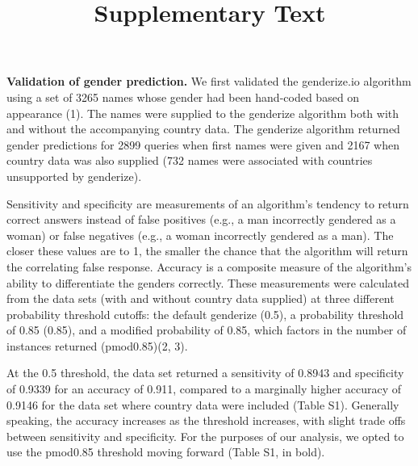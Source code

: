 \documentclass[11pt,]{article}
\title{Supplementary Text}
\author{}
\date{}
\begin{document}
\maketitle

\textbf{Validation of gender prediction.} We first validated the
genderize.io algorithm using a set of 3265 names whose gender had been
hand-coded based on appearance (1). The names were supplied to the
genderize algorithm both with and without the accompanying country data.
The genderize algorithm returned gender predictions for 2899 queries
when first names were given and 2167 when country data was also supplied
(732 names were associated with countries unsupported by genderize).

Sensitivity and specificity are measurements of an algorithm's tendency
to return correct answers instead of false positives (e.g., a man
incorrectly gendered as a woman) or false negatives (e.g., a woman
incorrectly gendered as a man). The closer these values are to 1, the
smaller the chance that the algorithm will return the correlating false
response. Accuracy is a composite measure of the algorithm's ability to
differentiate the genders correctly. These measurements were calculated
from the data sets (with and without country data supplied) at three
different probability threshold cutoffs: the default genderize (0.5), a
probability threshold of 0.85 (0.85), and a modified probability of
0.85, which factors in the number of instances returned (pmod0.85)(2,
3).

At the 0.5 threshold, the data set returned a sensitivity of 0.8943 and
specificity of 0.9339 for an accuracy of 0.911, compared to a marginally
higher accuracy of 0.9146 for the data set where country data were
included (Table S1). Generally speaking, the accuracy increases as the
threshold increases, with slight trade offs between sensitivity and
specificity. For the purposes of our analysis, we opted to use the
pmod0.85 threshold moving forward (Table S1, in bold).
\end{document}
